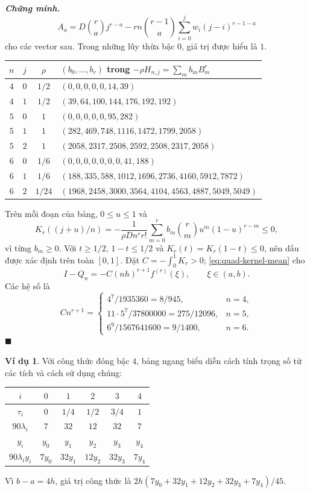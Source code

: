 \documentclass[12pt,a4paper,oneside]{book}
\numberwithin{algorithm}{chapter}
\theoremstyle{definition}
\newtheorem{vidu}{Ví dụ}[chapter]
\newenvironment{chungminh}{\par\medskip\noindent\textbf{\textit{\color{mainblue}Chứng minh.}}\ }{\hfill$\blacksquare$\par\medskip}
\begin{document}
\begin{chungminh}
\[ A_a=D\binom ra j^{r-a}-rn\binom{r-1}a\sum_{i=0}^jw_i(j-i)^{r-1-a}
\]
cho các vector sau. Trong những lũy thừa bậc $0$, giá trị được hiểu là $1$.
\begin{center}\scriptsize
\begin{tabular}{c|c|c|l}
\toprule
$n$ & $j$ & $\rho$ & $(b_0,\ldots,b_r)$ trong $-\rho H_{n,j}=\sum_m b_mB_m^r$\\
\midrule
$4$ & $0$ & $1/2$ & $(0,0,0,0,0,14,39)$\\
$4$ & $1$ & $1/2$ & $(39,64,100,144,176,192,192)$\\
$5$ & $0$ & $1$ & $(0,0,0,0,0,95,282)$\\
$5$ & $1$ & $1$ & $(282,469,748,1116,1472,1799,2058)$\\
$5$ & $2$ & $1$ & $(2058,2317,2508,2592,2508,2317,2058)$\\
$6$ & $0$ & $1/6$ & $(0,0,0,0,0,0,0,41,188)$\\
$6$ & $1$ & $1/6$ & $(188,335,588,1012,1696,2736,4160,5912,7872)$\\
$6$ & $2$ & $1/24$ & $(1968,2458,3000,3564,4104,4563,4887,5049,5049)$\\
\bottomrule
\end{tabular}\end{center}

Trên mỗi đoạn của bảng, $0\leq u\leq1$ và
\[
 K_r((j+u)/n)
 =-\frac1{\rho Dn^rr!}\sum_{m=0}^rb_m\binom rm u^m(1-u)^{r-m}\leq0,
\]
vì từng $b_m\geq0$. Với $t\geq1/2$, $1-t\leq1/2$ và $K_r(t)=K_r(1-t)\leq0$, nên dấu được xác định trên toàn $[0,1]$. Đặt $C=-\int_0^1K_r>0$; \eqref{eq:quad-kernel-mean} cho
\[
 I-Q_n=-C(nh)^{r+1}f^{(r)}(\xi),\qquad\xi\in(a,b).
\]
Các hệ số là
\[
 Cn^{r+1}=\begin{cases}
 4^7/1935360=8/945,&n=4,\\
 11\cdot5^7/37800000=275/12096,&n=5,\\
 6^9/1567641600=9/1400,&n=6.
 \end{cases}
\]
\end{chungminh}

\begin{vidu}
Với công thức đóng bậc $4$, bảng ngang biểu diễn cách tính trọng số từ các tích và cách sử dụng chúng:
\begin{center}
\begin{tabular}{c|ccccc}
\toprule
$i$ & $0$ & $1$ & $2$ & $3$ & $4$\\
\midrule
$\tau_i$ & $0$ & $1/4$ & $1/2$ & $3/4$ & $1$\\
$90\lambda_i$ & $7$ & $32$ & $12$ & $32$ & $7$\\
$y_i$ & $y_0$ & $y_1$ & $y_2$ & $y_3$ & $y_4$\\
$90\lambda_i y_i$ & $7y_0$ & $32y_1$ & $12y_2$ & $32y_3$ & $7y_4$\\
\bottomrule
\end{tabular}\end{center}
Vì $b-a=4h$, giá trị công thức là $2h(7y_0+32y_1+12y_2+32y_3+7y_4)/45$.
\end{vidu}
\end{document}
